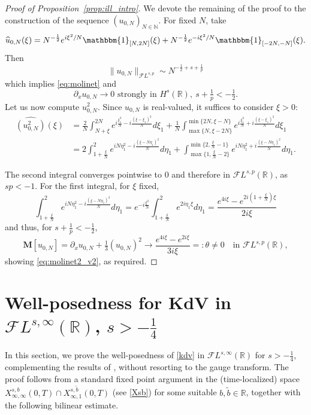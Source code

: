\documentclass[a4paper,
11pt,  reqno]{amsart}
\newcommand{\5}{\textup{V}}
\newcommand{\noi}{\noindent}
\newcommand{\FL}{\mathcal{F} L}
\newcommand{\F}{\mathcal{F}}
\newcommand{\wt}{\widetilde}
\newcommand{\dx}{\partial_x}
\theoremstyle{remark}
\newcommand{\R}{\mathbb{R}}
\newcommand{\MMb}{\mathbf{M}}
\newcommand{\N}{\mathbb{N}}
\numberwithin{equation}{section}
\numberwithin{theorem}{section}
\begin{document}
\begin{proof}[Proof of Proposition~\ref{prop:ill_intro}]
We devote the remaining of the proof to the construction of the sequence $(u_{0,N})_{N\in\N}$. 
	For fixed $N$, take
	$$
	\widehat{u}_{0,N}(\xi)= N^{-\frac12} e^{i\xi^2/N}\mathbbm{1}_{[N, 2N]}(\xi) + N^{-\frac12} e^{-i\xi^2/N}\mathbbm{1}_{[-2N, -N]}(\xi).
	$$
	Then 
	$$
	\|u_{0,N}\|_{\mathcal{F}L^{s,p}} \sim N^{-\frac12 +s+ \frac1p}
	$$
	which implies \eqref{eq:molinet} and
	$$
	\dx u_{0,N} \to 0 \mbox{ strongly in }H^{s}(\R), \ s+\tfrac1p<-\tfrac12.
	$$
	Let us now compute $u_{0,N}^2$. Since $u_{0,N}$ is real-valued, it suffices to consider $\xi>0$:
	\begin{align*}
		\widehat{(u_{0,N}^2)}(\xi) &= \frac{2}{N}\int_{N+\xi}^{2N} e^{i\frac{\xi_1^2}{N}-i\frac{(\xi-\xi_1)^2}{N}}d\xi_1 + \frac{1}{N}\int_{\max\{N, \xi-2N\}}^{\min\{2N, \xi-N\}}  e^{i\frac{\xi_1^2}{N}+i\frac{(\xi-\xi_1)^2}{N}}d\xi_1\\&=2\int_{1+\frac\xi N}^{2} e^{iN\eta_1^2-i\frac{(\xi-N\eta_1)^2}{N}}d\eta_1 + \int_{\max\{1, \frac{\xi}{N}-2\}}^{\min\{2, \frac{\xi}{N}-1\}}  e^{iN\eta_1^2+i\frac{(\xi-N\eta_1)^2}{N}}d\eta_1
        .
	\end{align*}


    \noi
The second integral converges pointwise to $0$ and therefore in $\mathcal{F}L^{s,p}(\R)$, as $sp<-1$. For the first integral,  for $\xi$ fixed,
\begin{equation}
	\int_{1+\frac\xi N}^{2} e^{iN\eta_1^2-i\frac{(\xi-N\eta_1)^2}{N}}d\eta_1 = e^{-i\frac{\xi^2}{N}}\int_{1 + \frac{\xi}{N}}^{2} e^{2i\eta_1\xi}d\eta_1  = \frac{e^{4i\xi}-e^{2i\left(1+\frac{\xi}{N}\right)\xi}}{2i\xi}
\end{equation}
and thus, for $s+\frac1p<-\frac12$,
\begin{equation}
	\MMb[u_{0,N}]= \dx u_{0,N} + \tfrac13 (u_{0,N})^2 \to \frac{e^{4i\xi}-e^{2i\xi}}{3i\xi} =: \theta \ne 0
    \quad \mbox{in }\mathcal{F}L^{s,p}(\R),
\end{equation}
showing \eqref{eq:molinet2_v2}, as required.
\end{proof}


\appendix




\section{Well-posedness for KdV in $\F L^{s,\infty}(\R)$, $s>-\frac14$}\label{sec:-14}

In this section, we prove the well-posedness of \eqref{kdv}
 in $\FL^{s, \infty}(\R)$ for $s>-\frac14$, complementing the results of \cite{Grunrock_ldv_hier}, without resorting to the gauge transform. 
The proof follows from a standard fixed point argument in the (time-localized) space $X^{s, b}_{\infty, \infty} (0,T) \cap X^{s, \wt b }_{\infty, 1} (0,T)$ (see \eqref{Xsb}) for some  suitable $b,\wt b\in \R$,
together with the following bilinear estimate. 
\end{document}
